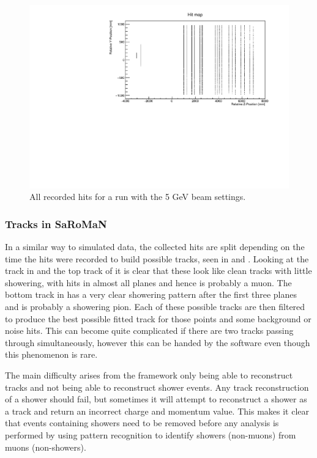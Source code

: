 \begin{figure}[h!]
\centering
\includegraphics[width=\textwidth]{figures/HitMap5GeVYZ.pdf}
\caption{All recorded hits for a run with the 5 GeV beam settings.}
\label{fig:hitmap}
\end{figure}


\subsubsection{Tracks in SaRoMaN}
In a similar way to simulated data, the collected hits are split depending on the time the hits were recorded to build possible tracks, seen in  and . Looking at the track in  and the top track of  it is clear that these look like clean tracks with little showering, with hits in almost all planes and hence is probably a muon. The bottom track in  has a very clear showering pattern after the first three planes and is probably a showering pion. Each of these possible tracks are then filtered to produce the best possible fitted track for those points and some background or noise hits. This can become quite complicated if there are two tracks passing through simultaneously, however this can be handed by the software even though this phenomenon is rare.

The main difficulty arises from the framework only being able to reconstruct tracks and not being able to reconstruct shower events. Any track reconstruction of a shower should fail, but sometimes it will attempt to reconstruct a shower as a track and return an incorrect charge and momentum value. This makes it clear that events containing showers need to be removed before any analysis is performed by using pattern recognition to identify showers (non-muons) from muons (non-showers).

